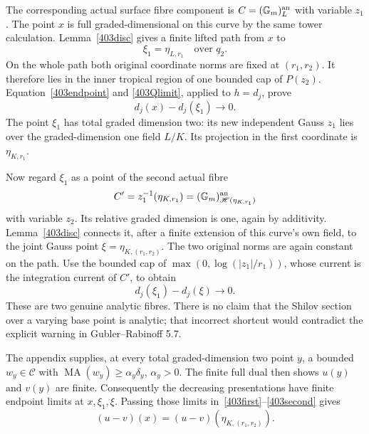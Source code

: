 \documentclass[11pt]{article}
\newcommand{\MA}{\operatorname{MA}}
\newcommand{\C}{\mathcal C}
\newcommand{\HH}{\mathscr H}
\theoremstyle{remark}\newtheorem{remark}[theorem]{Remark}
\begin{document}
The corresponding actual surface fibre component is
$C=(\mathbb G_m)^{\rm an}_L$ with variable $z_1$.
The point $x$ is full graded-dimensional on this curve
by the same tower calculation. Lemma~\ref{403disc} gives
a finite lifted path from $x$ to
\[
\xi_1=\eta_{L,r_1}\quad\text{over }q_2.
\]
On the whole path both original coordinate norms are
fixed at $(r_1,r_2)$. It therefore lies in the inner
tropical region of one bounded cap of $P(z_2)$.
Equation~\eqref{403endpoint} and
\eqref{403Qlimit}, applied to $h=d_j$, prove
\begin{equation}\label{403first}
d_j(x)-d_j(\xi_1)\longrightarrow0.
\end{equation}
The point $\xi_1$ has total graded dimension two: its
new independent Gauss $z_1$ lies over the graded-dimension
one field $L/K$. Its projection in the first coordinate
is $\eta_{K,r_1}$.

Now regard $\xi_1$ as a point of the second actual fibre
\[
C'=z_1^{-1}(\eta_{K,r_1})
=(\mathbb G_m)^{\rm an}_{\HH(\eta_{K,r_1})}
\]
with variable $z_2$. Its relative graded dimension is
one, again by additivity. Lemma~\ref{403disc} connects
it, after a finite extension of this curve's own field,
to the joint Gauss point
$\xi=\eta_{K,(r_1,r_2)}$. The two original norms are
again constant on the path. Use the bounded cap of
$\max(0,\log(|z_1|/r_1))$, whose current is the
integration current of $C'$, to obtain
\begin{equation}\label{403second}
d_j(\xi_1)-d_j(\xi)\longrightarrow0.
\end{equation}
These are two genuine analytic fibres. There is no
claim that the Shilov section over a varying base point
is analytic; that incorrect shortcut would contradict
the explicit warning in Gubler--Rabinoff 5.7.

The appendix supplies, at every total graded-dimension
two point $y$, a bounded $w_y\in\C$ with
$\MA(w_y)\ge\alpha_y\delta_y$, $\alpha_y>0$.
The finite full dual then shows $u(y)$ and $v(y)$ are
finite. Consequently the decreasing presentations have
finite endpoint limits at $x,\xi_1,\xi$. Passing those
limits in~\eqref{403first}--\eqref{403second} gives
\begin{equation}\label{403fulltoskeleton}
(u-v)(x)=(u-v)(\eta_{K,(r_1,r_2)}).
\end{equation}
\end{document}
